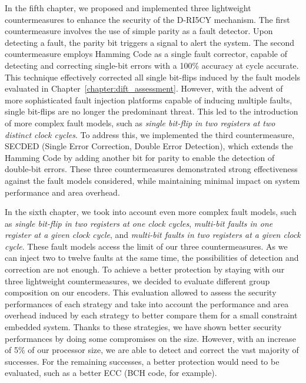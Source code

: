 In the fifth chapter, we proposed and implemented three lightweight countermeasures to enhance the security of the D-RI5CY mechanism. The first countermeasure involves the use of simple parity as a fault detector. Upon detecting a fault, the parity bit triggers a signal to alert the system. The second countermeasure employs Hamming Code as a single fault corrector, capable of detecting and correcting single-bit errors with a 100\% accuracy at cycle accurate. This technique effectively corrected all single bit-flips induced by the fault models evaluated in Chapter~\ref{chapter:dift_assessment}. However, with the advent of more sophisticated fault injection platforms capable of inducing multiple faults, single bit-flips are no longer the predominant threat. This led to the introduction of more complex fault models, such as \textit{single bit-flip in two registers at two distinct clock cycles}. To address this, we implemented the third countermeasure, SECDED (Single Error Correction, Double Error Detection), which extends the Hamming Code by adding another bit for parity to enable the detection of double-bit errors. These three countermeasures demonstrated strong effectiveness against the fault models considered, while maintaining minimal impact on system performance and area overhead.

In the sixth chapter, we took into account even more complex fault models, such as \textit{single bit-flip in two registers at one clock cycles}, \textit{multi-bit faults in one register at a given clock cycle}, and \textit{multi-bit faults in two registers at a given clock cycle}. These fault models access the limit of our three countermeasures. As we can inject two to twelve faults at the same time, the possibilities of detection and correction are not enough. To achieve a better protection by staying with our three lightweight countermeasures, we decided to evaluate different group composition on our encoders. This evaluation allowed to assess the security performances of each strategy and take into account the performance and area overhead induced by each strategy to better compare them for a small constraint embedded system. Thanks to these strategies, we have shown better security performances by doing some compromises on the size. However, with an increase of 5\% of our processor size, we are able to detect and correct the vast majority of successes. For the remaining successes, a better protection would need to be evaluated, such as a better ECC (BCH code, for example).

